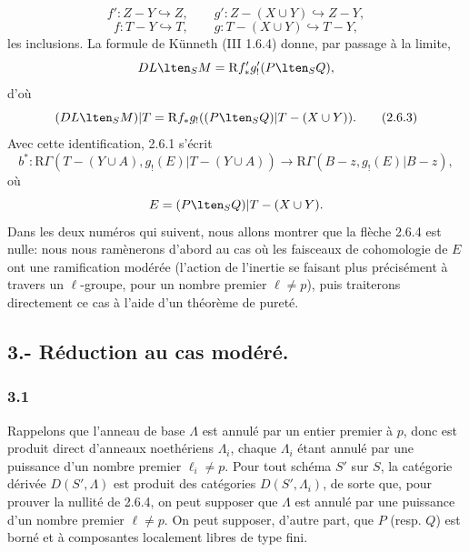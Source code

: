 \[
f':Z-Y\hookrightarrow Z,\qquad
g':Z-(X\cup Y)\hookrightarrow Z-Y,
\]
\[
f:T-Y\hookrightarrow T,\qquad
g:T-(X\cup Y)\hookrightarrow T-Y,
\]
les inclusions. La formule de Künneth (III 1.6.4) donne, par passage à la limite,
\[
DL\lten_SM=\mathrm{R} f'_*g'_!(P\lten_SQ),
\]
d'où
\begin{equation}
(DL\lten_SM)|T=\mathrm{R} f_*g_!((P\lten_SQ)|T-(X\cup Y)).
\tag{2.6.3}
\end{equation}
Avec cette identification, 2.6.1 s'écrit
\begin{equation}
b^*:\mathrm{R}\Gamma(T-(Y\cup A),g_!(E)|T-(Y\cup A))
 \longrightarrow \mathrm{R}\Gamma(B-z,g_!(E)|B-z),
\tag{2.6.4}
\end{equation}
où
\[
E=(P\lten_SQ)|T-(X\cup Y).
\]
Dans les deux numéros qui suivent, nous allons montrer que la flèche 2.6.4 est nulle: nous nous ramènerons d'abord au cas où les faisceaux de cohomologie de $E$ ont une ramification modérée (l'action de l'inertie se faisant plus précisément à travers un $\ell$-groupe, pour un nombre premier $\ell\ne p$), puis traiterons directement ce cas à l'aide d'un théorème de pureté.

\subsection*{3.- Réduction au cas modéré.}

\subsubsection*{3.1}
Rappelons que l'anneau de base $\Lambda$ est annulé par un entier premier à $p$, donc est produit direct d'anneaux noethériens $\Lambda_i$, chaque $\Lambda_i$ étant annulé par une puissance d'un nombre premier $\ell_i\ne p$. Pour tout schéma $S'$ sur $S$, la catégorie dérivée $D(S',\Lambda)$ est produit des catégories $D(S',\Lambda_i)$, de sorte que, pour prouver la nullité de 2.6.4, on peut supposer que $\Lambda$ est annulé par une puissance d'un nombre premier $\ell\ne p$. On peut supposer, d'autre part, que $P$ (resp. $Q$) est borné et à composantes localement libres de type fini.

